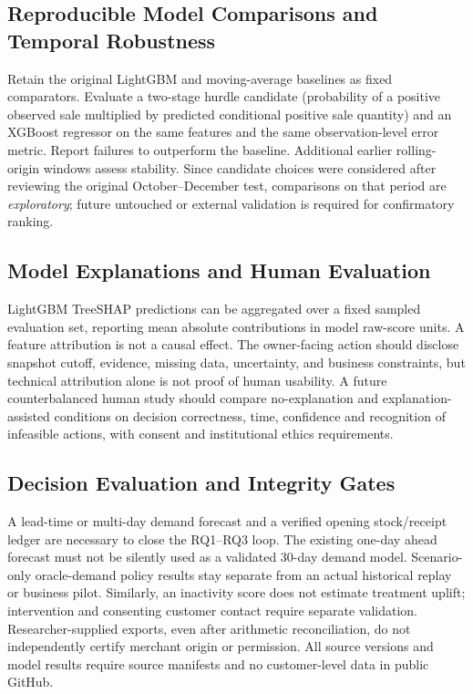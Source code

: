 \subsection{Reproducible Model Comparisons and Temporal Robustness}
Retain the original LightGBM and moving-average baselines as fixed comparators. Evaluate a two-stage hurdle candidate (probability of a positive observed sale multiplied by predicted conditional positive sale quantity) and an XGBoost regressor on the same features and the same observation-level error metric. Report failures to outperform the baseline. Additional earlier rolling-origin windows assess stability. Since candidate choices were considered after reviewing the original October--December test, comparisons on that period are \emph{exploratory}; future untouched or external validation is required for confirmatory ranking.

\subsection{Model Explanations and Human Evaluation}
LightGBM TreeSHAP predictions can be aggregated over a fixed sampled evaluation set, reporting mean absolute contributions in model raw-score units. A feature attribution is not a causal effect. The owner-facing action should disclose snapshot cutoff, evidence, missing data, uncertainty, and business constraints, but technical attribution alone is not proof of human usability. A future counterbalanced human study should compare no-explanation and explanation-assisted conditions on decision correctness, time, confidence and recognition of infeasible actions, with consent and institutional ethics requirements.

\subsection{Decision Evaluation and Integrity Gates}
A lead-time or multi-day demand forecast and a verified opening stock/receipt ledger are necessary to close the RQ1--RQ3 loop. The existing one-day ahead forecast must not be silently used as a validated 30-day demand model. Scenario-only oracle-demand policy results stay separate from an actual historical replay or business pilot. Similarly, an inactivity score does not estimate treatment uplift; intervention and consenting customer contact require separate validation. Researcher-supplied exports, even after arithmetic reconciliation, do not independently certify merchant origin or permission. All source versions and model results require source manifests and no customer-level data in public GitHub.
